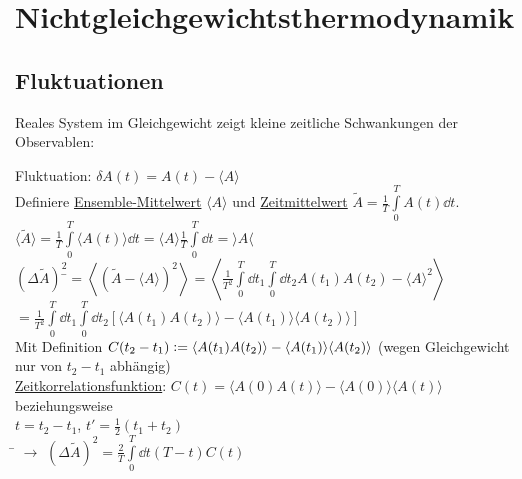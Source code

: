 \section{Nichtgleichgewichtsthermodynamik}
\subsection{Fluktuationen}
\begin{tabbing}
Reales System im Gleichgewicht zeigt kleine zeitliche Schwankungen der Observablen:
\end{tabbing}
\begin{figure}[H]
  \centering
\end{figure}
\begin{tabbing}
Fluktuation: $\delta A(t) = A(t) - \langle A \rangle$\\
Definiere \underline{Ensemble-Mittelwert} $\langle A \rangle$ und \underline{Zeitmittelwert} $\tilde{A} = \frac{1}{T} \int\limits_0^T A(t) \dd{t} $.\\
$\langle \tilde{A} \rangle = \frac{1}{T} \int\limits_0^T \langle A(t) \rangle \dd{t} = \langle A \rangle \frac{1}{T} \int\limits_0^T \dd{t} = \rangle A \langle$\\
$\left(\Delta \tilde{A}\right)^2$\=$= \left\langle \left(\tilde{A} - \langle A \rangle\right)^2\right\rangle = \left\langle \frac{1}{T^2} \int\limits_0^T\dd{t_1}\int\limits_0^T\dd{t_2} A(t_1)A(t_2) - \langle A \rangle^2\right\rangle$\\
\>$=\frac{1}{T^2}\int\limits_0^T\dd{t_1}\int\limits_0^T \dd{t_2}\left[\langle A(t_1)A(t_2)\rangle - \langle A(t_1) \rangle\langle A(t_2) \rangle\right]$\\
Mit Definition $C(t_2 - t_1) \vcentcolon = \langle A(t_1)A(t_2)\rangle - \langle A(t_1) \rangle\langle A(t_2) \rangle$ (wegen Gleichgewicht nur von $t_2 - t_1$ abhängig)\\
\underline{Zeitkorrelationsfunktion}: $C(t) = \langle A(0)A(t)\rangle - \langle A(0) \rangle \langle A(t)\rangle$\\
\> beziehungsweise \\
$t = t_2 - t_1$, $t' = \frac12 (t_1 + t_2)$\\
\hspace{4em} \= \kill
$\rightarrow$\> $\left(\Delta \tilde{A}\right)^2 = \frac{2}{T} \int\limits_0^T\dd{t} (T-t) C(t)$
\end{tabbing}
